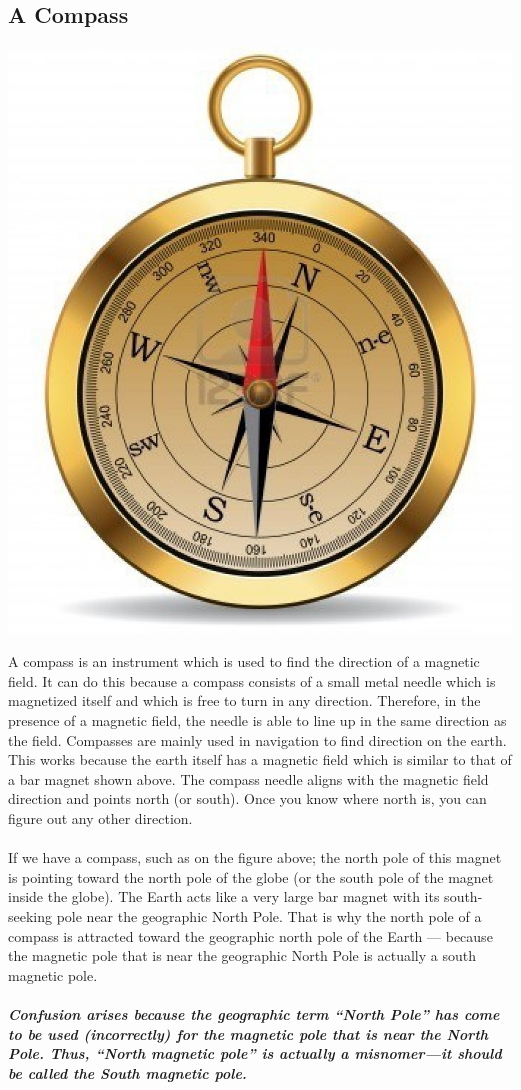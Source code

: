 \documentclass[9pt]{exam}
\begin{document}
	\subsection*{A Compass}
	\begin{center}
		\includegraphics[scale=0.1]{compass}
	\end{center}
	A compass is an instrument which is used to find the direction of a magnetic field. It can do this because a compass consists of a small metal needle which is magnetized itself and which is free to turn in any direction. Therefore, in the presence of a magnetic field, the needle is able to line up in the same direction as the field. Compasses are mainly used in navigation to find direction on the earth. This works because the earth itself has a magnetic field which is similar to that of a bar magnet shown above. The compass needle aligns with the magnetic field direction and points north (or south). Once you know where north is, you can figure out any other direction. \\ \\
	If we have a compass, such as on the figure above; the north pole of this magnet is pointing toward the north pole of the globe (or the south pole of the magnet inside the globe). The Earth acts like a very large bar magnet with its south-seeking pole near the geographic North Pole. That is why the north pole of a compass is attracted toward the geographic north pole of the Earth — because the magnetic pole that is near the geographic North Pole is actually a south magnetic pole. \\ \\ \textbf{\textit{Confusion arises because the geographic term “North Pole” has come to be used (incorrectly) for the magnetic pole that is near the North Pole. Thus, “North magnetic pole” is actually a misnomer—it should be called the South magnetic pole.}}
\end{document}

